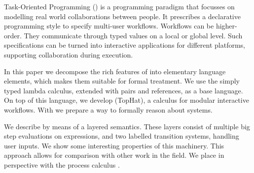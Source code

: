 
Task-Oriented Programming (\TOP) is a programming paradigm that focusses on modelling real world collaborations between people.
It prescribes a declarative programming style to specify multi-user workflows.
Workflows can be higher-order.
They communicate through typed values on a local or global level.
Such specifications can be turned into interactive applications for different platforms,
supporting collaboration during execution.

In this paper we decompose the rich features of \TOP into elementary language elements,
which makes them suitable for formal treatment.
We use the simply typed lambda calculus, extended with pairs and references, as a base language.
On top of this language, we develop \TOPHAT (TopHat), a calculus for modular interactive workflows.
With \TOPHAT we prepare a way to formally reason about \TOP systems.

We describe \TOPHAT by means of a layered semantics.
These layers consist of multiple big step evaluations on expressions,
and two labelled transition systems, handling user inputs.
We show some interesting properties of this machinery.
This approach allows for comparison with other work in the field.
We place \TOPHAT in perspective with the process calculus \CSP.


%
%
%
